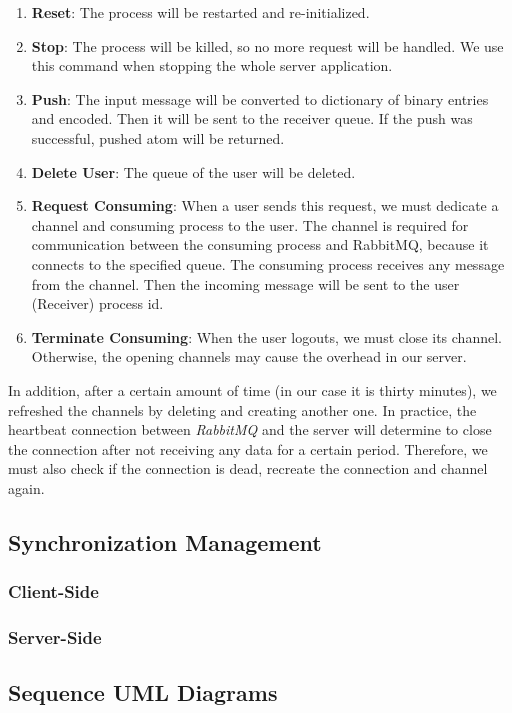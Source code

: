 \begin{enumerate}
	\item \textbf{Reset}: The process will be restarted and re-initialized. 
	\item \textbf{Stop}: The process will be killed, so no more request will be handled. We use this command when stopping the whole server application. 
	\item \textbf{Push}: The input message will be converted to dictionary of binary entries and encoded. Then it will be sent to the receiver queue. If the push was successful, pushed atom will be returned. 
	\item \textbf{Delete User}: The queue of the user will be deleted. 
	\item \textbf{Request Consuming}: When a user sends this request, we must dedicate a channel and consuming process to the user. The channel is required for communication between the consuming process and RabbitMQ, because it connects to the specified queue. The consuming process receives any message from the channel. Then the incoming message will be sent to the user (Receiver) process id.
	\item \textbf{Terminate Consuming}: When the user logouts, we must close its channel. Otherwise, the opening channels may cause the overhead in our server.
\end{enumerate}

In addition, after a certain amount of time (in our case it is thirty minutes), we refreshed the channels by deleting and creating another one. In practice, the heartbeat connection between  \textit{RabbitMQ}  and the server will determine to close the connection after not receiving any data for a certain period. Therefore, we must also check if the connection is dead, recreate the connection and channel again. 

\subsection{Synchronization Management}
\subsubsection{Client-Side}
\subsubsection{Server-Side}

\subsection{Sequence UML Diagrams}

